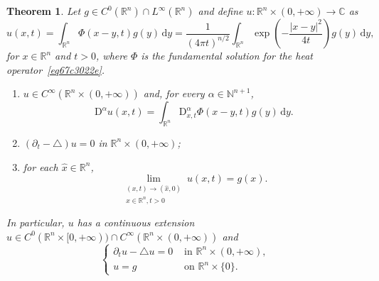 \documentclass[a4paper,9pt]{amsart}
\newcommand{\N}{\mathbb{N}}	%
\newcommand{\R}{\mathbb{R}}	%
\newcommand{\C}{\mathbb{C}}	%
\newcommand{\did}{\,\mathrm{d}}	%
\newcommand{\de}{\partial}		%
\newcommand{\Diff}{\mathrm{D}}
\newcommand{\laplacian}{\triangle}
\theoremstyle{plain}
\newtheorem{theorem}[proposition]{Theorem}
\theoremstyle{definition}
\theoremstyle{remark}
\begin{document}
\begin{theorem}\label{thm67c30be5}
	Let $g\in C^0(\R^n)\cap L^\infty(\R^n)$ and define $u:\R^n\times (0,+\infty) \to \C$ as
	\begin{equation}
		u(x,t) = \int_{\R^n} \Phi(x-y,t) g(y) \did y
		= \frac1{(4\pi t)^{n/2}} \int_{\R^n} \exp\left( -\frac{|x-y|^2}{4t} \right) g(y) \did y ,
	\end{equation}
	for $x\in\R^n$ and $t>0$,
	where $\Phi$ is the fundamental solution for the heat operator~\eqref{eq67c3022e}.
	\begin{enumerate}
	\item\label{thm67c30be5_smooth}
		$u\in C^\infty(\R^n\times (0,+\infty))$ and, for every $\alpha\in\N^{n+1}$,
		\begin{equation}\label{eq67c33d51}
			\Diff^\alpha u(x,t) = \int_{\R^n} \Diff_{x,t}^\alpha\Phi(x-y,t) g(y) \did y .
		\end{equation}
	\item\label{thm67c30be5_heat}
		$(\de_t-\laplacian)u=0$ in $\R^n\times (0,+\infty)$;
	\item\label{thm67c30be5_init}
		for each $\hat x\in\R^n$, 
		\begin{equation}\label{eq67c342bb}
			\lim_{\substack{(x,t)\to(\hat x,0) \\ x\in\R^n,t>0}} u(x,t) = g(x) .
		\end{equation}
	\end{enumerate}
	In particular, $u$ has a continuous extension $u\in C^0(\R^n\times [0,+\infty))\cap C^\infty(\R^n\times (0,+\infty))$ and %
	\begin{equation}\label{eq67c30ca6}
	\begin{cases}
		\de_t u - \laplacian u = 0 & \text{ in }\R^n\times (0,+\infty) , \\
		u = g & \text{ on }\R^n\times\{0\} .
	\end{cases}
	\end{equation}
\end{theorem}
\end{document}
